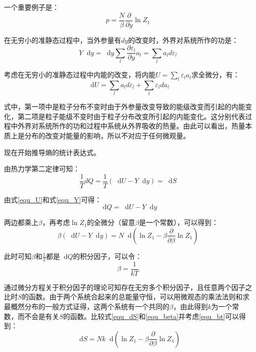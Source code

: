 \documentclass[UTF8]{ctexart}
\newcommand*{\dif}{\mathop{}\!\mathrm{d}}
\begin{document}
\noindent 一个重要例子是：
	\begin{equation}
	p=\frac{N}{\beta} \frac{\partial}{\partial y} \ln Z_{1}
	\end{equation}
	
	在无穷小的准静态过程中，当外参量有$ dy $的改变时，外界对系统所作的功是：
	\begin{equation}
		Y \dif y=\dif y \sum_{l}\frac{\partial \varepsilon_{l}}{\partial y} a_{l}=\sum_{l} a_{l}d\varepsilon_{l}
	\end{equation}
	
	考虑在无穷小的准静态过程中内能的改变，将内能$ U=\sum_{l} \varepsilon_{l} a_{l} $求全微分，有：
	\begin{equation}
		\dif U=\sum_{l} a_{l}d \varepsilon_{l}+\sum_{l} \varepsilon_{l} d a_{l}\label{equ_dU}
	\end{equation}
	
\noindent 式中，第一项中是粒子分布不变时由于外参量改变导致的能级改变而引起的内能变化，第二项是粒子能级不变时由于粒子分布改变所引起的内能变化。这分别代表过程中外界对系统所作的功和过程中系统从外界吸收的热量。由此可以看出，热量本质上是分布的改变对能量的影响，所以不对应于任何微观量。

	现在开始推导熵的统计表达式。
	
	由热力学第二定律可知：
	\begin{equation}
		\frac{1}{T}dQ=\frac{1}{T}\left(\dif U-Y\dif y \right)=\dif S \label{equ_dS}
	\end{equation}
	
	由式\ref{equ_U}和式\ref{equ_Y}可得：
	\begin{equation}
		\dif Q=\dif U-Y\dif y
	\end{equation}
	
	两边都乘上$ \beta $，再考虑$ \ln Z_{1} $的全微分（留意$ \beta $是一个常数），可以得到：
	\begin{equation}
		\beta (\dif U-Y\dif y)=N\dif \left(\ln Z_{1}-\beta \frac{\partial}{\partial \beta} \ln Z_{1}\right)\label{equ_beta}
	\end{equation}
	
	此时可知$ \beta $和$ \frac{1}{T} $都是$ \dif Q $的积分因子，可以令：
	\begin{equation}
		\beta=\frac{1}{kT}\label{equ_bt}
	\end{equation}
	
	通过微分方程关于积分因子的理论可知存在无穷多个积分因子，且任意两个因子之比时$ S $的函数。由于两个系统合起来的总能量守恒，可以用微观态的乘法法则和求最概然分布的一般方式证得，这两个系统有一个共同的$ \beta $，由此得到$ k $为一个常数，而不会是有关$ S $的函数。比较式\ref{equ_dS}和\ref{equ_beta}并考虑\ref{equ_bt}可以得到：
	\begin{equation}
		\dif S=Nk\dif \left(\ln Z_{1}-\beta \frac{\partial}{\partial \beta} \ln Z_{1}\right)
	\end{equation}
	
\end{document}
